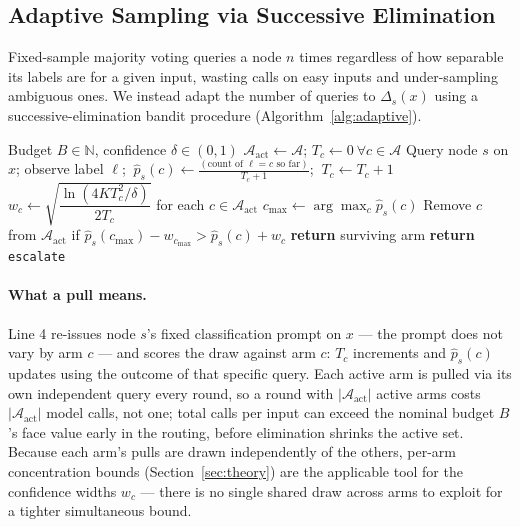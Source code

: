 \subsection{Adaptive Sampling via Successive Elimination}
\label{sec:algorithm}

Fixed-sample majority voting queries a node $n$ times regardless of how separable its labels are for a given input, wasting calls on easy inputs and under-sampling ambiguous ones. We instead adapt the number of queries to $\Delta_s(x)$ using a successive-elimination bandit procedure (Algorithm~\ref{alg:adaptive}).

\begin{algorithm}[h]
\caption{Adaptive Sampling for Node $s$, Input $x$}
\label{alg:adaptive}
\begin{algorithmic}[1]
\REQUIRE Budget $B \in \mathbb{N}$, confidence $\delta \in (0,1)$
\STATE $\mathcal{A}_{\text{act}} \leftarrow \mathcal{A}$; \quad $T_c \leftarrow 0 \ \forall c \in \mathcal{A}$
        \STATE Query node $s$ on $x$; observe label $\ell$; $\ \hat p_s(c) \leftarrow \frac{(\text{count of } \ell = c \text{ so far})}{T_c + 1}$; $\ T_c \leftarrow T_c + 1$
    \ENDFOR
    \STATE $w_c \leftarrow \sqrt{\dfrac{\ln(4KT_c^2/\delta)}{2T_c}}$ \quad for each $c \in \mathcal{A}_{\text{act}}$
    \STATE $c_{\max} \leftarrow \arg\max_c \hat p_s(c)$
    \STATE Remove $c$ from $\mathcal{A}_{\text{act}}$ if $\hat p_s(c_{\max}) - w_{c_{\max}} > \hat p_s(c) + w_c$
\ENDWHILE
{}
    \STATE \textbf{return} surviving arm
\ELSE
    \STATE \textbf{return} \texttt{escalate}
\ENDIF
\end{algorithmic}
\end{algorithm}

\paragraph{What a pull means.} Line 4 re-issues node $s$'s fixed classification prompt on $x$ — the prompt does not vary by arm $c$ — and scores the draw against arm $c$: $T_c$ increments and $\hat p_s(c)$ updates using the outcome of that specific query. Each active arm is pulled via its own independent query every round, so a round with $|\mathcal{A}_{\text{act}}|$ active arms costs $|\mathcal{A}_{\text{act}}|$ model calls, not one; total calls per input can exceed the nominal budget $B$'s face value early in the routing, before elimination shrinks the active set. Because each arm's pulls are drawn independently of the others, per-arm concentration bounds (Section~\ref{sec:theory}) are the applicable tool for the confidence widths $w_c$ — there is no single shared draw across arms to exploit for a tighter simultaneous bound.

